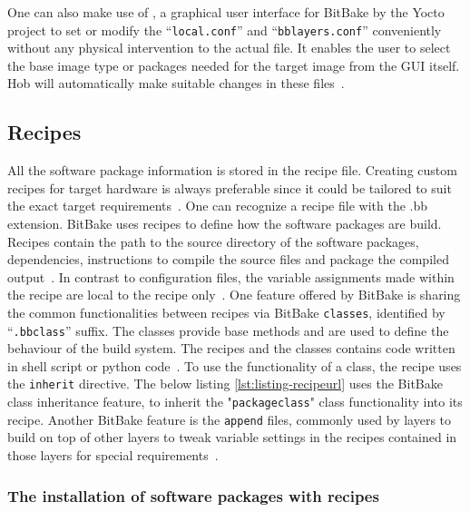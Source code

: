 One can also make use of , a graphical user interface for BitBake by the Yocto project to set or modify the “\texttt{local.conf}” and “\texttt{bblayers.conf}” conveniently without any physical intervention to the actual file. It enables the user to select the base image type or packages needed for the target image from the \ac{GUI} itself. Hob will automatically make suitable changes in these files~\parencite{swain2015design}. 
\subsection{Recipes} \label{section:recipes}

All the software package information is stored in the recipe file. Creating custom recipes for  target hardware is always preferable since it could be tailored to suit the exact target requirements~\parencite{swain2015design}. One can recognize a recipe file with the .bb extension. BitBake uses recipes to define how the software packages are build. Recipes contain the path to the source directory of the software packages, dependencies, instructions to compile the source files and package the compiled output~\parencite{veromannembedded}. In contrast to configuration files, the variable assignments made within the recipe are local to the recipe only~\parencite{ Reference1}. One feature offered by BitBake is sharing the common functionalities between recipes via BitBake \texttt{classes}, identified by “\texttt{.bbclass}” suffix. The classes provide base methods and are used to define the behaviour of the build system. The recipes and the classes contains code written in shell script or python code~\parencite{salvador2014embedded}. To use the functionality of a class, the recipe uses the \texttt{inherit} directive. The below listing \ref{lst:listing-recipeurl} uses the BitBake class inheritance feature, to inherit the "\texttt{packageclass}" class functionality into its recipe. Another BitBake feature is the \texttt{append} files, commonly used by layers to build on top of other layers to tweak variable settings in the recipes contained in those layers for special requirements~\parencite{Reference1}.

\subsubsection{The installation of software packages with recipes} \label{section:softwarepackageinrecipes}

